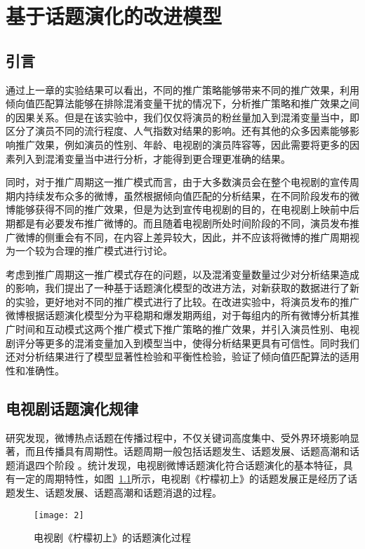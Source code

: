 \chapter{基于话题演化的改进模型}

\section{引言}

通过上一章的实验结果可以看出，不同的推广策略能够带来不同的推广效果，利用倾向值匹配算法能够在排除混淆变量干扰的情况下，分析推广策略和推广效果之间的因果关系。但是在该实验中，我们仅仅将演员的粉丝量加入到混淆变量当中，即区分了演员不同的流行程度、人气指数对结果的影响。还有其他的众多因素能够影响推广效果，例如演员的性别、年龄、电视剧的演员阵容等，因此需要将更多的因素列入到混淆变量当中进行分析，才能得到更合理更准确的结果。

同时，对于推广周期这一推广模式而言，由于大多数演员会在整个电视剧的宣传周期内持续发布众多的微博，虽然根据倾向值匹配的分析结果，在不同阶段发布的微博能够获得不同的推广效果，但是为达到宣传电视剧的目的，在电视剧上映前中后期都是有必要发布推广微博的。而且随着电视剧所处时间阶段的不同，演员发布推广微博的侧重会有不同，在内容上差异较大，因此，并不应该将微博的推广周期视为一个较为合理的推广模式进行讨论。

考虑到推广周期这一推广模式存在的问题，以及混淆变量数量过少对分析结果造成的影响，我们提出了一种基于话题演化模型的改进方法，对新获取的数据进行了新的实验，更好地对不同的推广模式进行了比较。在改进实验中，将演员发布的推广微博根据话题演化模型分为平稳期和爆发期两组，对于每组内的所有微博分析其推广时间和互动模式这两个推广模式下推广策略的推广效果，并引入演员性别、电视剧评分等更多的混淆变量加入到模型当中，使得分析结果更具有可信性。同时我们还对分析结果进行了模型显著性检验和平衡性检验，验证了倾向值匹配算法的适用性和准确性。

\section{电视剧话题演化规律}

研究发现，微博热点话题在传播过程中，不仅关键词高度集中、受外界环境影响显著，而且传播具有周期性。话题周期一般包括话题发生、话题发展、话题高潮和话题消退四个阶段 \cite{赵龙文2013基于意见领袖参与行为的微博话题热度预测研究}。统计发现，电视剧微博话题演化符合话题演化的基本特征，具有一定的周期特性，如图~\ref{ning}所示，电视剧《柠檬初上》的话题发展正是经历了话题发生、话题发展、话题高潮和话题消退的过程。

\begin{figure}[!htbp]
\centering
\texttt{[image: 2]}
\caption{电视剧《柠檬初上》的话题演化过程}
\label{ning}
\end{figure}


